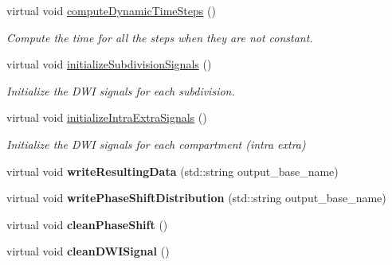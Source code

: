 \begin{DoxyCompactItemize}
\mbox{\label{class_simulable_sequence_a3c5285531564cdb204894e6c6fc9204e}} 
virtual void \hyperlink{class_simulable_sequence_a3c5285531564cdb204894e6c6fc9204e}{compute\+Dynamic\+Time\+Steps} ()
\begin{DoxyCompactList}\small\item\em Compute the time for all the steps when they are not constant. \end{DoxyCompactList}\item 
\mbox{\label{class_simulable_sequence_aa2434c3b2ef59d1cd8b822b8e3a2920c}} 
virtual void \hyperlink{class_simulable_sequence_aa2434c3b2ef59d1cd8b822b8e3a2920c}{initialize\+Subdivision\+Signals} ()
\begin{DoxyCompactList}\small\item\em Initialize the D\+WI signals for each subdivision. \end{DoxyCompactList}\item 
\mbox{\label{class_simulable_sequence_a3fad0e115a2ec07a8b1202608eba698e}} 
virtual void \hyperlink{class_simulable_sequence_a3fad0e115a2ec07a8b1202608eba698e}{initialize\+Intra\+Extra\+Signals} ()
\begin{DoxyCompactList}\small\item\em Initialize the D\+WI signals for each compartment (intra extra) \end{DoxyCompactList}\item 
\mbox{\label{class_simulable_sequence_a372f6d9f448c537afde10e30b68428aa}} 
virtual void {\bfseries write\+Resulting\+Data} (std\+::string output\+\_\+base\+\_\+name)
\item 
\mbox{\label{class_simulable_sequence_aa6c72a9d84fda0fe15551f84a28d427d}} 
virtual void {\bfseries write\+Phase\+Shift\+Distribution} (std\+::string output\+\_\+base\+\_\+name)
\item 
\mbox{\label{class_simulable_sequence_a49a95a0735a939b65495be51ce0fb1be}} 
virtual void {\bfseries clean\+Phase\+Shift} ()
\item 
\mbox{\label{class_simulable_sequence_af8396d72ccbb4ad1e8a403e554b8e8e1}} 
virtual void {\bfseries clean\+D\+W\+I\+Signal} ()
\end{DoxyCompactItemize}
